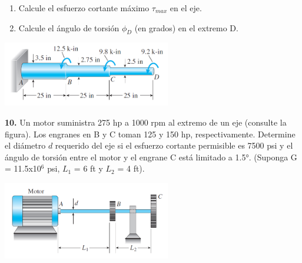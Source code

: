 \documentclass[12pt,letterpaper]{article}
\begin{document}
\begin{enumerate}[label=\alph*,itemsep=0pt]
\item Calcule el esfuerzo cortante máximo $\tau_{max}$ en el eje.
\item Calcule el ángulo de torsión $\phi_D$ (en grados) en el extremo D.
\end{enumerate}

\begin{center}
\includegraphics[width=0.55\textwidth]{img/p9.PNG}
\end{center}


\textbf{10.} Un motor suministra 275 hp a 1000 rpm al extremo de
un eje (consulte la figura). Los engranes en B y C toman 125 y
150 hp, respectivamente. Determine el diámetro $d$ requerido del eje si el esfuerzo
cortante permisible es 7500 psi y el ángulo de torsión entre el
motor y el engrane C está limitado a 1.5°. (Suponga G = 11.5x10$^6$ psi, $L_1$ = 6 ft y $L_2$ = 4 ft).

\begin{center}
\includegraphics[width=0.55\textwidth]{img/p10.PNG}
\end{center}
\end{document}
